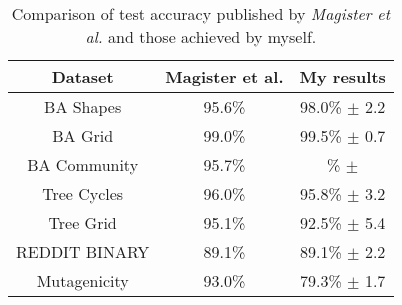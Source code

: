 \begin{table}
    \centering
    \begin{tabular}{c|cc}
        \multicolumn{1}{c}{\textbf{Dataset}} &
        \multicolumn{1}{c}{\textbf{Magister et al.}} &
        \multicolumn{1}{c}{\textbf{My results}} \\
        \midrule
        BA Shapes       & 95.6\% & 98.0\% $\pm$ 2.2 \\
        BA Grid         & 99.0\% & 99.5\% $\pm$ 0.7 \\
        BA Community    & 95.7\% & \% $\pm$  \\
        Tree Cycles     & 96.0\% & 95.8\% $\pm$ 3.2 \\
        Tree Grid       & 95.1\% & 92.5\% $\pm$ 5.4 \\
        \midrule
        REDDIT BINARY   & 89.1\% & 89.1\% $\pm$ 2.2 \\
        Mutagenicity    & 93.0\% & 79.3\% $\pm$ 1.7 \\
    \end{tabular}
    \caption{Comparison of test accuracy published by \textit{Magister et al.}\cite{magister2021gcexplainer} and those achieved by myself.}
    \label{tab:GCN-acc}
\end{table}


